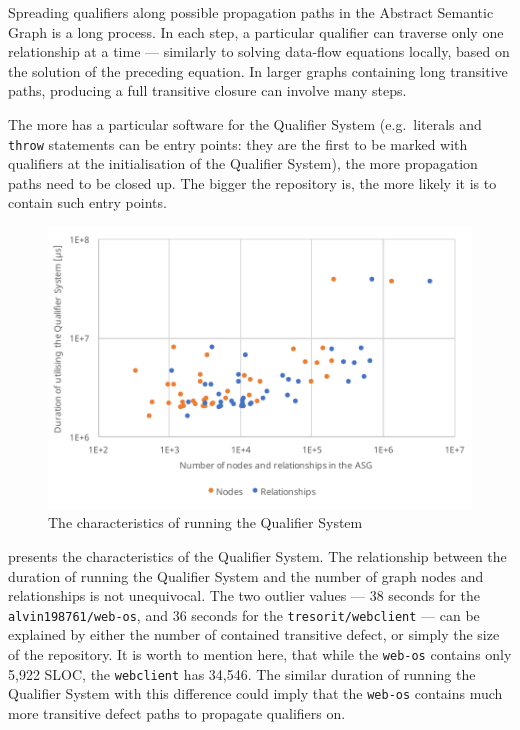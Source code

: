 Spreading qualifiers along possible propagation paths in the Abstract Semantic Graph is a long process. In each step, a particular qualifier can traverse only one relationship at a time — similarly to solving data-flow equations locally, based on the solution of the preceding equation. In larger graphs containing long transitive paths, producing a full transitive closure can involve many steps.

The more  has a particular software for the Qualifier System (e.g.\ literals and \lstinline{throw} statements can be entry points: they are the first to be marked with qualifiers at the initialisation of the Qualifier System), the more propagation paths need to be closed up. The bigger the repository is, the more likely it is to contain such entry points.

\begin{figure}[!htb]
	\centerfloat
	\includegraphics[width=\textwidth,clip]{figures/measurement-qualifiersystem-nodes-relationships.pdf}
	\caption{The characteristics of running the Qualifier System}
	\label{fig:measurement-qualifiersystem-nodes-relationships}
\end{figure}

 presents the characteristics of the Qualifier System. The relationship between the duration of running the Qualifier System and the number of graph nodes and relationships is not unequivocal. The two outlier values — 38 seconds for the \lstinline{alvin198761/web-os}, and 36 seconds for the \lstinline{tresorit/webclient} — can be explained by either the number of contained transitive defect, or simply the size of the repository. It is worth to mention here, that while the \lstinline{web-os} contains only 5,922 SLOC, the \lstinline{webclient} has 34,546. The similar duration of running the Qualifier System with this difference could imply that the \lstinline{web-os} contains much more transitive defect paths to propagate qualifiers on.


